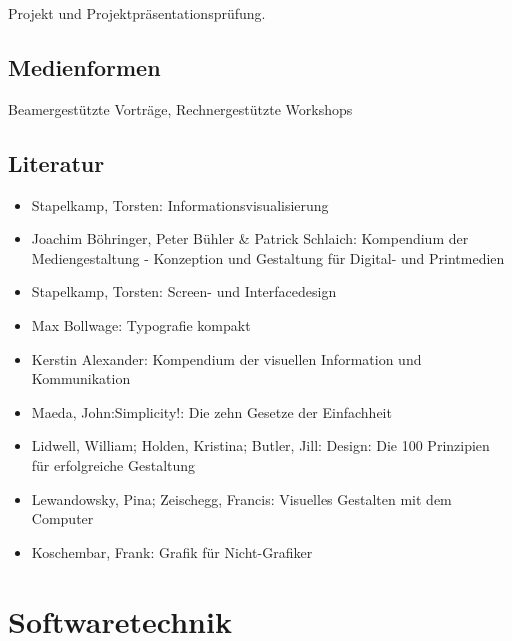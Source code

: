 Projekt und Projektpräsentationsprüfung.

\hypertarget{medienformenpathlabelmi-2017modulbeschreibungen-bachelorba_screendesign}{%
\section*{Medienformen\label{/mi-2017/modulbeschreibungen-bachelor/BA_Screendesign}}\label{medienformenpathlabelmi-2017modulbeschreibungen-bachelorba_screendesign}}

Beamergestützte Vorträge, Rechnergestützte Workshops

\hypertarget{literaturpathlabelmi-2017modulbeschreibungen-bachelorba_screendesign}{%
\section*{Literatur\label{/mi-2017/modulbeschreibungen-bachelor/BA_Screendesign}}\label{literaturpathlabelmi-2017modulbeschreibungen-bachelorba_screendesign}}

\begin{itemize}
\tightlist
\item
  Stapelkamp, Torsten: Informationsvisualisierung
\item
  Joachim Böhringer, Peter Bühler \& Patrick Schlaich: Kompendium der
  Mediengestaltung - Konzeption und Gestaltung für Digital- und
  Printmedien
\item
  Stapelkamp, Torsten: Screen- und Interfacedesign
\item
  Max Bollwage: Typografie kompakt
\item
  Kerstin Alexander: Kompendium der visuellen Information und
  Kommunikation
\item
  Maeda, John:Simplicity!: Die zehn Gesetze der Einfachheit
\item
  Lidwell, William; Holden, Kristina; Butler, Jill: Design: Die 100
  Prinzipien für erfolgreiche Gestaltung
\item
  Lewandowsky, Pina; Zeischegg, Francis: Visuelles Gestalten mit dem
  Computer
\item
  Koschembar, Frank: Grafik für Nicht-Grafiker
\end{itemize}

\hypertarget{softwaretechnikpathlabelmi-2017modulbeschreibungen-bachelorba_softwaretechnik}{%
\chapter{Softwaretechnik\label{/mi-2017/modulbeschreibungen-bachelor/BA_Softwaretechnik}}\label{softwaretechnikpathlabelmi-2017modulbeschreibungen-bachelorba_softwaretechnik}}

